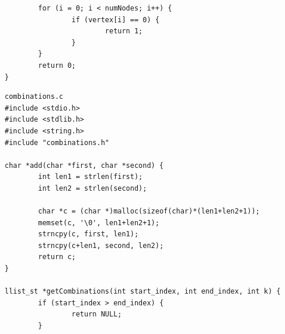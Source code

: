 \documentclass[11pt]{article}
\begin{document}
\begin{lstlisting}
        for (i = 0; i < numNodes; i++) {
                if (vertex[i] == 0) {
                        return 1;
                }
        }
        return 0;
}

\end{lstlisting}
\begin{lstlisting}
combinations.c
#include <stdio.h>
#include <stdlib.h>
#include <string.h>
#include "combinations.h"

char *add(char *first, char *second) {
        int len1 = strlen(first);
        int len2 = strlen(second);

        char *c = (char *)malloc(sizeof(char)*(len1+len2+1));
        memset(c, '\0', len1+len2+1);
        strncpy(c, first, len1);
        strncpy(c+len1, second, len2);
        return c;
}

llist_st *getCombinations(int start_index, int end_index, int k) {
        if (start_index > end_index) {
                return NULL;
        }


\end{lstlisting}
\end{document}
